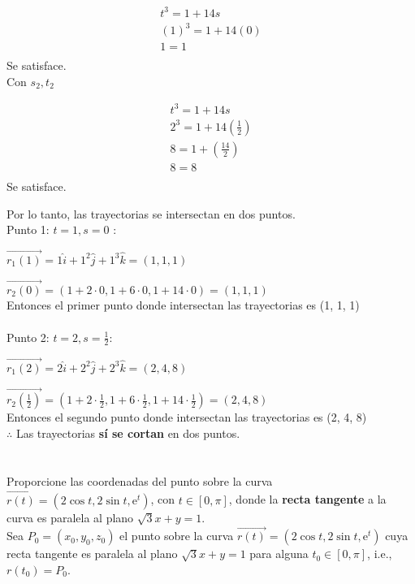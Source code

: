 \documentclass[12pt]{article}
\begin{document}
\begin{align*}
  t^3 =  1+14s \\
  (1)^3 =  1+14(0)  \\
  1 =  1  \\
\end{align*}
Se satisface. \\
Con $s_2, t_2$

\begin{align*}
  t^3 =  1+14s \\
  2^3 =  1+14 \left( \frac{1}{2} \right) \\
  8  =  1 + \left(\frac{14}{2} \right) \\
   8  =  8 \\
\end{align*}
Se satisface.

Por lo tanto, las trayectorias se intersectan en dos puntos.\\
Punto 1: $t=1 , s=0$ :
\item $\vec{r_1(1)}=1\hat{i}+1^2\hat{j}+1^3\hat{k} = (1, 1, 1) $

\item $\vec{r_2(0)}=(1+2 \cdot 0,1+6 \cdot 0,1+14 \cdot 0) = (1, 1, 1) $\\
  Entonces el primer punto donde intersectan las trayectorias es (1, 1, 1) \\ \\
 Punto 2: $t=2 , s=\frac{1}{2}$:
  \item $\vec{r_1(2)}=2\hat{i}+2^2\hat{j}+2^3\hat{k} = (2, 4, 8) $

\item $\vec{r_2(\frac{1}{2})}=(1+2 \cdot \frac{1}{2} ,1+6 \cdot \frac{1}{2},1+14 \cdot \frac{1}{2}) = (2, 4, 8) $\\
  Entonces el segundo punto donde intersectan las trayectorias es (2, 4, 8) \\
$ \therefore $ Las trayectorias \textbf{sí se cortan} en dos puntos.
\section{}
Proporcione las coordenadas del punto sobre la curva $\vec{r(t)}=(2\cos{t},2\sin{t},\mathrm{e}^t)$, con $t \in [0,\pi]$, donde la \textbf{recta tangente} a la curva es paralela al plano $\sqrt{3}x+y=1$. \\

Sea $P_0=(x_0,y_0,z_0)$ el punto sobre la curva $\vec{r(t)}=(2\cos{t},2\sin{t},\mathrm{e}^t)$ cuya recta tangente es paralela al plano $\sqrt{3}x+y=1$ para alguna $t_0 \in [0,\pi]$, i.e., $r(t_0)=P_0$.
\end{document}
